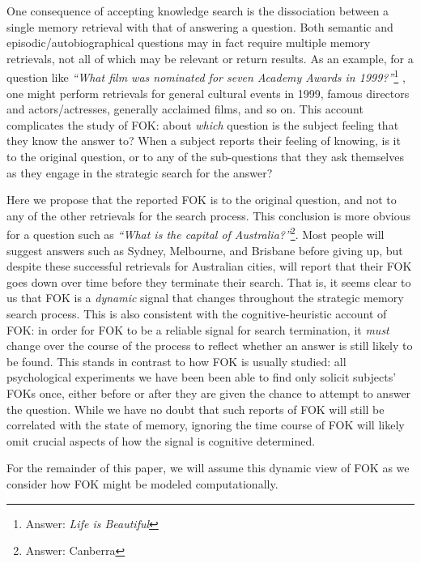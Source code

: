 \documentclass[10pt,letterpaper]{article}
\newcommand{\question}[2]{\emph{``#1''}\footnote{Answer: #2}}
\begin{document}
One consequence of accepting knowledge search is the dissociation between a single memory retrieval with that of answering a question.
Both semantic and episodic/autobiographical questions may in fact require multiple memory retrievals, not all of which may be relevant or return results.
As an example, for a question like \question{What film was nominated for seven Academy Awards in 1999?}{\emph{Life is Beautiful}} \cite{Norman2016TheRelationshipBetween}, one might perform retrievals for general cultural events in 1999, famous directors and actors/actresses, generally acclaimed films, and so on.
This account complicates the study of FOK: about \emph{which} question is the subject feeling that they know the answer to?
When a subject reports their feeling of knowing, is it to the original question, or to any of the sub-questions that they ask themselves as they engage in the strategic search for the answer?

Here we propose that the reported FOK is to the original question, and not to any of the other retrievals for the search process.
This conclusion is more obvious for a question such as \question{What is the capital of Australia?}{Canberra}.
Most people will suggest answers such as Sydney, Melbourne, and Brisbane before giving up, but despite these successful retrievals for Australian cities, will report that their FOK goes down over time before they terminate their search.
That is, it seems clear to us that FOK is a \emph{dynamic} signal that changes throughout the strategic memory search process.
This is also consistent with the cognitive-heuristic account of FOK: in order for FOK to be a reliable signal for search termination, it \emph{must} change over the course of the process to reflect whether an answer is still likely to be found.
This stands in contrast to how FOK is usually studied: all psychological experiments we have been been able to find only solicit subjects' FOKs once, either before or after they are given the chance to attempt to answer the question. %
While we have no doubt that such reports of FOK will still be correlated with the state of memory, ignoring the time course of FOK will likely omit crucial aspects of how the signal is cognitive determined.

For the remainder of this paper, we will assume this dynamic view of FOK as we consider how FOK might be modeled computationally.
\end{document}
